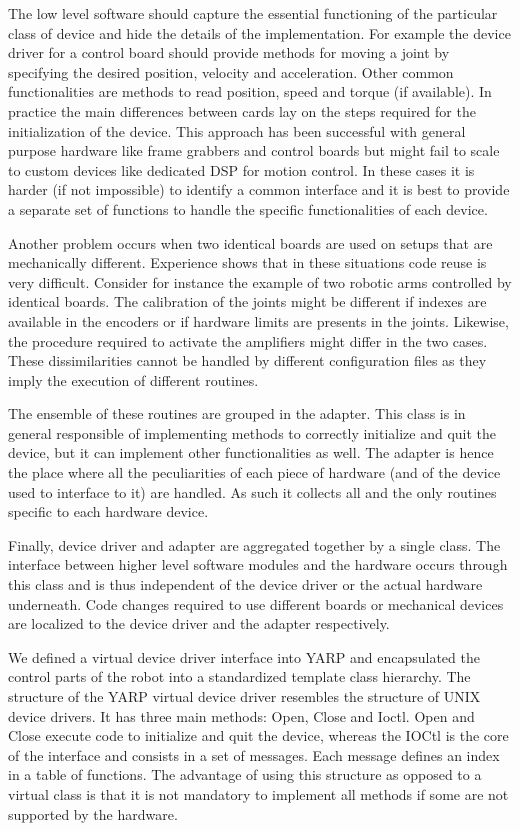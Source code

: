 The low level software should capture the essential functioning of the
particular class of device and hide the details of the
implementation. For example the device driver for a control board
should provide methods for moving a joint by specifying the desired
position, velocity and acceleration. Other common functionalities are
methods to read position, speed and torque (if available). In practice
the main differences between cards lay on the steps required for the
initialization of the device. This approach has been successful with
general purpose hardware like frame grabbers and control boards but
might fail to scale to custom devices like dedicated DSP for motion
control. In these cases it is harder (if not impossible) to identify a
common interface and it is best to provide a separate set of functions
to handle the specific functionalities of each device.

Another problem occurs when two identical boards are used
on setups that are mechanically different. Experience shows that in
these situations code reuse is very difficult. Consider for instance
the example of two robotic arms controlled by identical boards. The
calibration of the joints might be different if indexes are available
in the encoders or if hardware limits are presents in the
joints. Likewise, the procedure required to activate the amplifiers
might differ in the two cases. These dissimilarities cannot be handled
by different configuration files as they imply the execution of
different routines.

The ensemble of these routines are grouped in the adapter. This class
is in general responsible of implementing methods to correctly
initialize and quit the device, but it can implement other
functionalities as well. The adapter is hence the place where all the
peculiarities of each piece of hardware (and of the device used to
interface to it) are handled. As such it collects all and the only
routines specific to each hardware device.

Finally, device driver and adapter are aggregated together by a single
class. The interface between higher level software modules and the
hardware occurs through this class and is thus independent of the
device driver or the actual hardware underneath. Code changes required
to use different boards or mechanical devices are localized to the
device driver and the adapter respectively.

We defined a virtual device driver interface into YARP and
encapsulated the control parts of the robot into a standardized
template class hierarchy. The structure of the YARP virtual device
driver resembles the structure of UNIX device drivers. It has three
main methods: Open, Close and Ioctl. Open and Close execute code to
initialize and quit the device, whereas the IOCtl is the core of the
interface and consists in a set of messages. Each message defines an
index in a table of functions. The advantage of using this structure
as opposed to a virtual class is that it is not mandatory to implement
all methods if some are not supported by the hardware.

